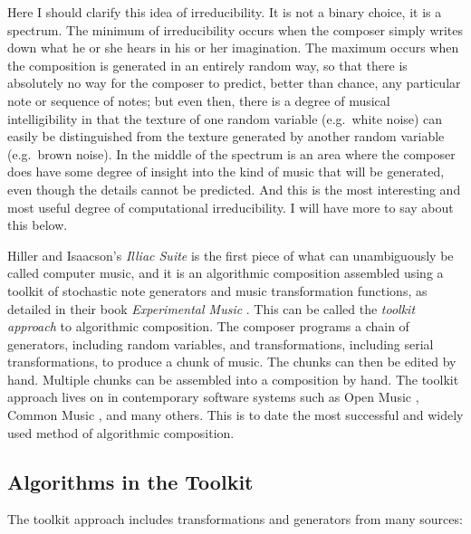 \documentclass[11pt]{scrartcl}
\begin{document}
Here I should clarify this idea of irreducibility. It is not a binary choice, it is a spectrum. The minimum of irreducibility occurs when the composer simply writes down what he or she hears in his or her imagination. The maximum occurs when the composition is generated in an entirely random way, so that there is absolutely no way for the composer to predict, better than chance, any particular note or sequence of notes; but even then, there is a degree of musical intelligibility in that the texture of one random variable (e.g.\ white noise) can easily be distinguished from the texture generated by another random variable (e.g.\ brown noise). In the middle of the spectrum is an area where the composer does have some degree of insight into the kind of music that will be generated, even though the details cannot be predicted. And this is the most interesting and most useful degree of computational irreducibility. I will have more to say about this below.

Hiller and Isaacson's \emph{Illiac Suite} \parencite{illiacsuite} is the first piece of what can unambiguously be called computer music, and it is an algorithmic composition assembled using a toolkit of stochastic note generators and music transformation functions, as detailed in their book \emph{Experimental Music} \parencite{hiller}. This can be called the \emph{toolkit approach} to algorithmic composition. The composer programs a chain of generators, including random variables, and transformations, including serial transformations, to produce a chunk of music. The chunks can then be edited by hand. Multiple chunks can be assembled into a composition by hand. The toolkit approach lives on in contemporary software systems such as Open Music \parencite{OpenMusic}, Common Music \parencite{CommonMusic, musx}, and many others. This is to date the most successful and widely used method of algorithmic composition. 

\subsection*{Algorithms in the Toolkit}

The toolkit approach includes transformations and generators from many sources:
\end{document}
